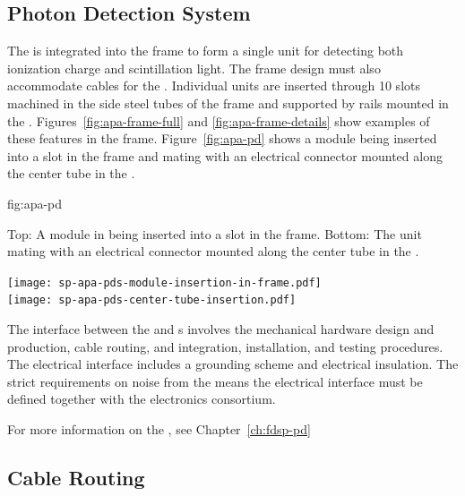 \subsection{Photon Detection System}
\label{sec:fdsp-apa-intfc-pds}

The  is integrated into the  frame to form a single unit for detecting both ionization charge and scintillation light.  The  frame design must also accommodate cables for the .  
Individual  units are inserted through \num{10} slots machined in the side steel tubes of the frame and supported by rails mounted in the . Figures~\ref{fig:apa-frame-full} and \ref{fig:apa-frame-details} show examples of these features in the frame. Figure~\ref{fig:apa-pd} shows a  module being inserted into a slot in the frame and mating with an electrical connector mounted along the center tube in the .

\begin{dunefigure}{fig:apa-pd}
{Top: A  module in  being inserted into a slot in the frame. Bottom: The  unit mating with an electrical connector mounted along the center tube in the .

}
\texttt{[image: sp-apa-pds-module-insertion-in-frame.pdf]}\\
\vspace{2mm}
\texttt{[image: sp-apa-pds-center-tube-insertion.pdf]}
\end{dunefigure}

The interface between the  and s involves the mechanical hardware design and production, cable routing, and integration, installation, and testing procedures. The electrical interface includes a grounding scheme and electrical insulation. The strict requirements on noise from the  means the electrical interface must be defined together with the   electronics consortium. 

For more information on the , see Chapter~\ref{ch:fdsp-pd} %



\subsection{Cable Routing}
\label{sec:fdsp-apa-intfc-cables}

